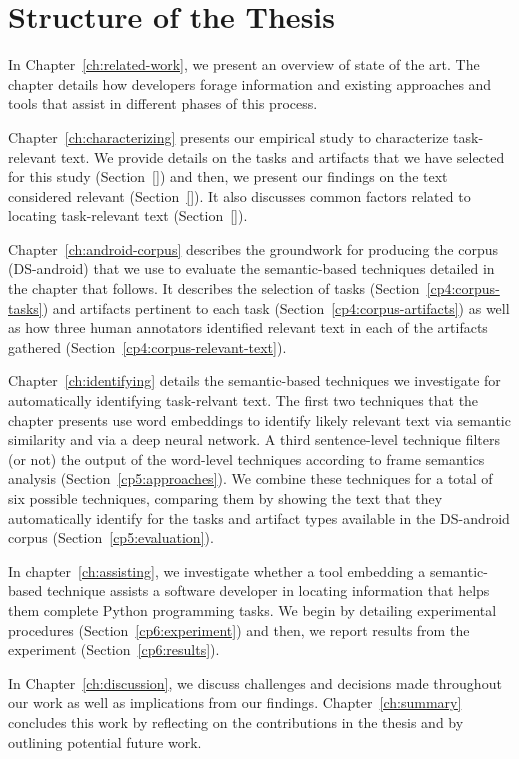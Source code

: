\section{Structure of the Thesis}
\label{cp1:organization}

In Chapter~\ref{ch:related-work}, we present an overview of state of the art. The chapter details 
how developers forage information and existing approaches and tools 
that assist in different phases of this process.


Chapter~\ref{ch:characterizing} presents our empirical study to characterize task-relevant text.
We provide details on the tasks and artifacts that we have selected for this study (Section~\ref{})
and then, we present our findings on the text considered relevant (Section~\ref{}).
It also discusses common factors related to locating task-relevant text (Section~\ref{}).


Chapter~\ref{ch:android-corpus} describes the groundwork 
for producing the corpus (\acs{DS-android}) that we use to evaluate the semantic-based techniques 
detailed in the chapter that follows. It describes the selection of tasks (Section~\ref{cp4:corpus-tasks}) and 
artifacts pertinent to each task (Section~\ref{cp4:corpus-artifacts})
as well as how three human annotators identified relevant text in each of the artifacts gathered (Section~\ref{cp4:corpus-relevant-text}).


Chapter~\ref{ch:identifying} details the semantic-based techniques we investigate for automatically 
identifying task-relvant text.
The first two techniques that the chapter presents 
use word embeddings to identify likely relevant text via semantic similarity
and via a deep neural network.
A third sentence-level technique filters (or not) 
the output of the word-level techniques according to frame semantics analysis (Section~\ref{cp5:approaches}).
We combine these techniques for a total of six possible techniques, comparing them by showing
the text that they automatically identify for the tasks and artifact types
available in the \acs{DS-android} corpus  (Section~\ref{cp5:evaluation}).




In chapter~\ref{ch:assisting}, 
we investigate 
whether a tool embedding a semantic-based technique assists a software developer in locating information
that helps them complete Python programming tasks. We begin by detailing experimental procedures (Section~\ref{cp6:experiment})
and then, we report results from the experiment (Section~\ref{cp6:results}).


In Chapter~\ref{ch:discussion}, we discuss challenges and decisions 
made throughout our work 
as well as implications from our findings. 
Chapter~\ref{ch:summary} concludes this work by reflecting on the contributions in the thesis
and by outlining  potential future work. 
